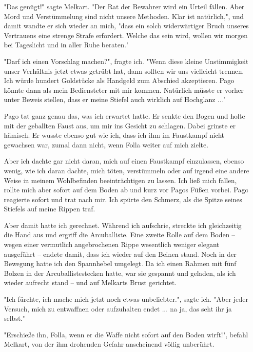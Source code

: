 \documentclass[10pt, a4paper, oneside]{book}
\begin{document}
\begin{multicols}{2}
"Das genügt!" sagte Melkart. "Der Rat der Bewahrer wird ein Urteil fällen. Aber Mord und Verstümmelung sind nicht unsere Methoden. Klar ist natürlich,", und damit wandte er sich wieder an mich, "dass ein solch widerwärtiger Bruch unseres Vertrauens eine strenge Strafe erfordert. Welche das sein wird, wollen wir morgen bei Tageslicht und in aller Ruhe beraten."

"Darf ich einen Vorschlag machen?", fragte ich. "Wenn diese kleine Unstimmigkeit unser Verhältnis jetzt etwas getrübt hat, dann sollten wir uns vielleicht trennen. Ich würde hundert Goldstücke als Handgeld zum Abschied akzeptieren. Pago könnte dann als mein Bediensteter mit mir kommen. Natürlich müsste er vorher unter Beweis stellen, dass er meine Stiefel auch wirklich auf Hochglanz ..."

Pago tat ganz genau das, was ich erwartet hatte. Er senkte den Bogen und holte mit der geballten Faust aus, um mir ins Gesicht zu schlagen. Dabei grinste er hämisch. Er wusste ebenso gut wie ich, dass ich ihm im Faustkampf nicht gewachsen war, zumal dann nicht, wenn Folla weiter auf mich zielte.

Aber ich dachte gar nicht daran, mich auf einen Faustkampf einzulassen, ebenso wenig, wie ich daran dachte, mich töten, verstümmeln oder auf irgend eine andere Weise in meinem Wohlbefinden beeinträchtigen zu lassen. Ich ließ mich fallen, rollte mich aber sofort auf dem Boden ab und kurz vor Pagos Füßen vorbei. Pago reagierte sofort und trat nach mir. Ich spürte den Schmerz, als die Spitze seines Stiefels auf meine Rippen traf.

Aber damit hatte ich gerechnet. Während ich aufschrie, streckte ich gleichzeitig die Hand aus und ergriff die Arcuballiste. Eine zweite Rolle auf dem Boden – wegen einer vermutlich angebrochenen Rippe wesentlich weniger elegant ausgeführt – endete damit, dass ich wieder auf den Beinen stand. Noch in der Bewegung hatte ich den Spannhebel umgelegt. Da ich einen Rahmen mit fünf Bolzen in der Arcuballistestecken hatte, war sie gespannt und geladen, als ich wieder aufrecht stand – und auf Melkarts Brust gerichtet.

"Ich fürchte, ich mache mich jetzt noch etwas unbeliebter.", sagte ich. "Aber jeder Versuch, mich zu entwaffnen oder aufzuhalten endet ... na ja, das seht ihr ja selbst."

"Erschieße ihn, Folla, wenn er die Waffe nicht sofort auf den Boden wirft!", befahl Melkart, von der ihm drohenden Gefahr anscheinend völlig unberührt.


\end{multicols}
\end{document}
